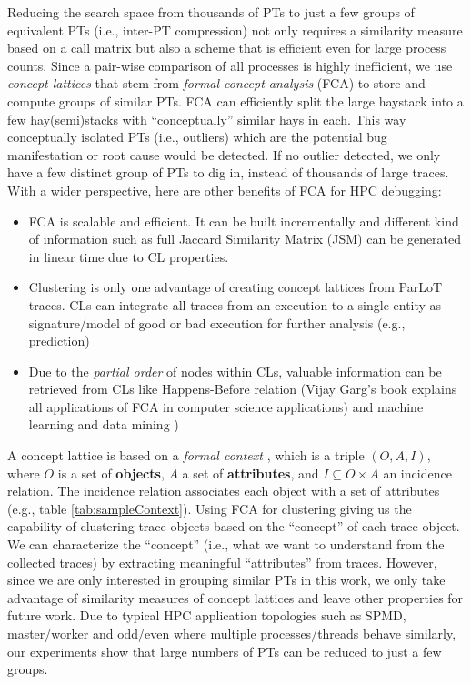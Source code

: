 Reducing the search space from thousands of PTs to just a few groups of equivalent PTs (i.e., inter-PT compression) not only requires a similarity measure based on a call matrix but also a scheme that is efficient even for large process counts.
%
Since a pair-wise comparison of all processes is highly inefficient, we use \textit{concept lattices} that stem from \textit{formal concept analysis} (FCA) \cite{clbook} to store and compute groups of similar PTs.
%
FCA can efficiently split the large haystack into a few hay(semi)stacks with ``conceptually'' similar hays in each. This way conceptually isolated PTs (i.e., outliers) which are the potential bug manifestation or root cause would be detected. If no outlier detected, we only have a few distinct group of PTs to dig in, instead of thousands of large traces. With a wider perspective, here are other benefits of FCA for HPC debugging:
\begin{itemize}
\item FCA is scalable and efficient. It can be built incrementally and different kind of information such as full Jaccard Similarity Matrix (JSM) can be generated in linear time due to CL properties.
\item Clustering is only one advantage of creating concept lattices from ParLoT traces. CLs can integrate all traces from an execution to a single entity as signature/model of good or bad execution for further analysis (e.g., prediction) 
\item Due to the \textit{partial order} of nodes within CLs, valuable information can be retrieved from CLs like Happens-Before relation (Vijay Garg’s book explains all applications of FCA in computer science applications)\cite{latticeForDistConst} and machine learning and data mining \cite{Ignatov17})
\end{itemize}

A concept lattice is based on a \textit{formal context} \cite{clbook}, which is a triple $(O, A, I)$, where $O$ is a set of \textbf{objects}, $A$ a set of \textbf{attributes}, and $I \subseteq O \times A$ an incidence relation. The incidence relation associates each object with a set of attributes (e.g., table \ref{tab:sampleContext}).
%
Using FCA for clustering giving us the capability of clustering trace objects based on the ``concept'' of each trace object. We can characterize the ``concept'' (i.e., what we want to understand from the collected traces) by extracting meaningful ``attributes'' from traces. 
%
However, since we are only interested in grouping similar PTs in this work, we only take advantage of similarity measures \cite{Alqadah2011} of concept lattices and leave other properties for future work.
%
Due to typical HPC application topologies such as SPMD, master/worker and odd/even where multiple processes/threads behave similarly, our experiments show that large numbers of PTs can be reduced to just a few groups.
%





